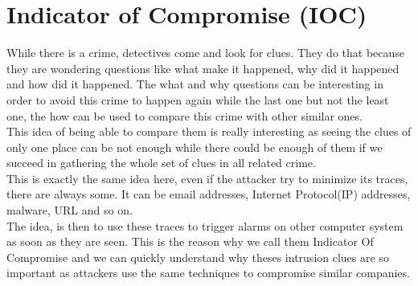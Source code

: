 \documentclass{eplmastersthesis}
\begin{document}
\section{Indicator of Compromise (IOC)}
While there is a crime, detectives come and look for clues. They do that because they are wondering questions like what make it happened, why did it happened and how did it happened. The what and why questions can be interesting in order to avoid this crime to happen again while the last one but not the least one, the how can be used to compare this crime with other similar ones.\\
This idea of being able to compare them is really interesting as seeing the clues of only one place can be not enough while there could be enough of them if we succeed in gathering the whole set of clues in all related crime.\\
This is exactly the same idea here, even if the attacker try to minimize its traces, there are always some. It can be email addresses, Internet Protocol(IP) addresses, malware, URL and so on.\\
The idea, is then to use these traces to trigger alarms on other computer system as soon as they are seen. This is the reason why we call them Indicator Of Compromise and we can quickly understand why theses intrusion clues are so important as attackers use the same techniques to compromise similar companies.
\end{document}
